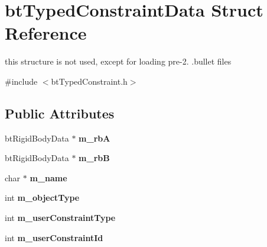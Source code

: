 \hypertarget{structbt_typed_constraint_data}{\section{bt\+Typed\+Constraint\+Data Struct Reference}
\label{structbt_typed_constraint_data}
}


this structure is not used, except for loading pre-\/2. .bullet files  




{\ttfamily \#include $<$bt\+Typed\+Constraint.\+h$>$}

\subsection*{Public Attributes}
\begin{DoxyCompactItemize}
\item 
\hypertarget{structbt_typed_constraint_data_a67f18e8811a1321266d7d943b1b6d3b0}{bt\+Rigid\+Body\+Data $\ast$ {\bfseries m\+\_\+rb\+A}}\label{structbt_typed_constraint_data_a67f18e8811a1321266d7d943b1b6d3b0}

\item 
\hypertarget{structbt_typed_constraint_data_aef60cd110edb32bb35a3f483a4bf7442}{bt\+Rigid\+Body\+Data $\ast$ {\bfseries m\+\_\+rb\+B}}\label{structbt_typed_constraint_data_aef60cd110edb32bb35a3f483a4bf7442}

\item 
\hypertarget{structbt_typed_constraint_data_a3c9ab2afd6eb427375168828baa3953f}{char $\ast$ {\bfseries m\+\_\+name}}\label{structbt_typed_constraint_data_a3c9ab2afd6eb427375168828baa3953f}

\item 
\hypertarget{structbt_typed_constraint_data_a90328a5349c208bedbd01b2842dec893}{int {\bfseries m\+\_\+object\+Type}}\label{structbt_typed_constraint_data_a90328a5349c208bedbd01b2842dec893}

\item 
\hypertarget{structbt_typed_constraint_data_a21d2705048b7d78783b884b4eb07694b}{int {\bfseries m\+\_\+user\+Constraint\+Type}}\label{structbt_typed_constraint_data_a21d2705048b7d78783b884b4eb07694b}

\item 
\hypertarget{structbt_typed_constraint_data_ad7d64995bdaacfe70a8df2116073889f}{int {\bfseries m\+\_\+user\+Constraint\+Id}}\label{structbt_typed_constraint_data_ad7d64995bdaacfe70a8df2116073889f}


\end{DoxyCompactItemize}
